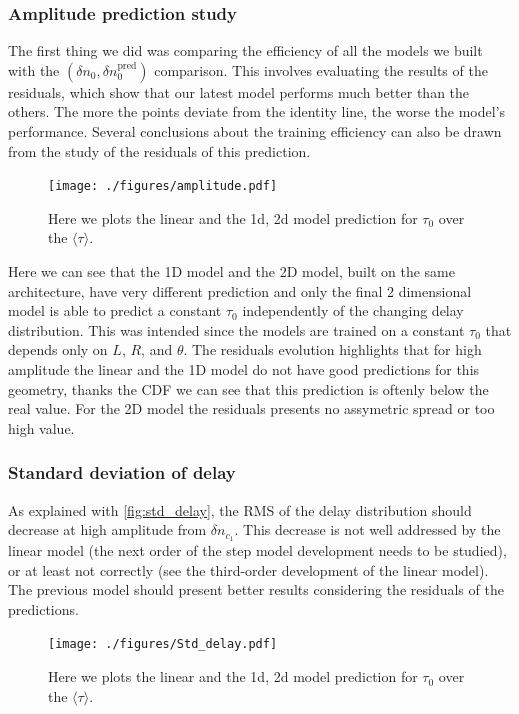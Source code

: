 \documentclass[11pt,a4paper,openany]{report}
\begin{document}
\begin{multicols}{2}
    \subsubsection{Amplitude prediction study}

    The first thing we did was comparing the efficiency of all the models we built with the \((\delta n_0, \delta n_0^{\text{pred}})\) comparison. This involves evaluating the results of the residuals, which show that our latest model performs much better than the others. The more the points deviate from the identity line, the worse the model's performance. Several conclusions about the training efficiency can also be drawn from the study of the residuals of this prediction.

    \begin{figure}[H]
        \centering
        \hspace*{-1.3cm}\texttt{[image: ./figures/amplitude.pdf]}
        \label{}
        \caption{Here we plots the linear and the 1d, 2d model prediction for $\tau_0$ over the $\langle \tau \rangle$.}
    \end{figure}

    Here we can see that the 1D model and the 2D model, built on the same architecture, have very different prediction and only the final 2 dimensional model is able to predict a constant \(\tau_0\) independently of the changing delay distribution. This was intended since the models are trained on a constant \(\tau_0\) that depends only on \(L\), \(R\), and \(\theta\). The residuals evolution highlights that for high amplitude the linear and the 1D model do not have good predictions for this geometry, thanks the CDF we can see that this prediction is oftenly below the real value. For the 2D model the residuals presents no assymetric spread or too high value.
    \subsubsection{Standard deviation of delay}

    As explained with \ref{fig:std_delay}, the RMS of the delay distribution should decrease at high amplitude from \(\delta n_{c_1}\). This decrease is not well addressed by the linear model (the next order of the step model development needs to be studied), or at least not correctly (see the third-order development of the linear model). The previous model should present better results considering the residuals of the predictions.

    \begin{figure}[H]
        \centering
        \hspace*{0cm}\texttt{[image: ./figures/Std\_delay.pdf]}
        \label{}
        \caption{Here we plots the linear and the 1d, 2d model prediction for $\tau_0$ over the $\langle \tau \rangle$.}
    \end{figure}



\end{multicols}
\end{document}
